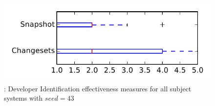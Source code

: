
\begin{figure}
\centering
\includegraphics[height=0.4\textheight]{figures/dit_seed/rq1_tiny_43}
\caption{\rtwo: Developer Identification effectiveness measures for all subject systems with $seed=43$}
\label{fig:dit_seed:rq1:tiny}
\end{figure}
